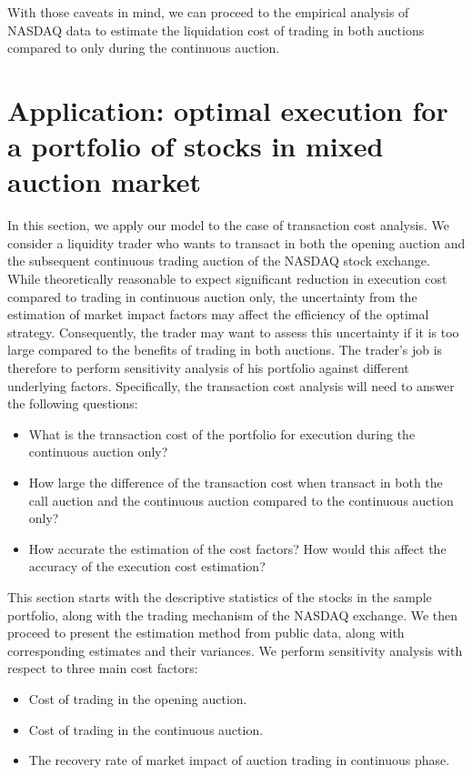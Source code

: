 With those caveats in mind, we can proceed to the empirical analysis of NASDAQ data to estimate the liquidation cost of trading in both auctions compared to only during the continuous auction.

\section{Application: optimal execution for a portfolio of stocks in mixed auction market}\label{sec:EmpiricalAnalysis}

In this section, we apply our model to the case of transaction cost analysis. We consider a liquidity trader who wants to transact in both the opening auction and the subsequent continuous trading auction of the NASDAQ stock exchange. While theoretically reasonable to expect significant reduction in execution cost compared to trading in continuous auction only, the uncertainty from the estimation of market impact factors may affect the efficiency of the optimal strategy. Consequently, the trader may want to assess this uncertainty if it is too large compared to the benefits of trading in both auctions. The trader's job is therefore to perform sensitivity analysis of his portfolio against different underlying factors. Specifically, the transaction cost analysis will need to answer the following questions:

\begin{itemize}
  \item What is the transaction cost of the portfolio for execution during the continuous auction only?
  \item How large the difference of the transaction cost when transact in both the call auction and the continuous auction compared to the continuous auction only?
  \item How accurate the estimation of the cost factors? How would this affect the accuracy of the execution cost estimation?
\end{itemize}

This section starts with the descriptive statistics of the stocks in the sample portfolio, along with the trading mechanism of the NASDAQ exchange. We then proceed to present the estimation method from public data, along with corresponding estimates and their variances. We perform sensitivity analysis with respect to three main cost factors:
\begin{itemize}
  \item Cost of trading in the opening auction.
  \item Cost of trading in the continuous auction.
  \item The recovery rate of market impact of auction trading in continuous phase.
\end{itemize}

